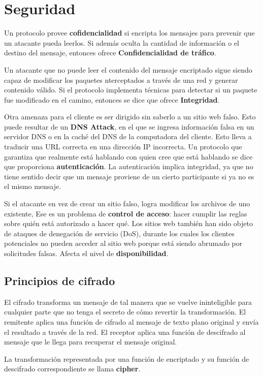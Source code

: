 \section{Seguridad}
Un protocolo provee \textbf{cofidencialidad} si encripta los mensajes para prevenir que un atacante pueda leerlos. Si además oculta la cantidad de información o el destino del mensaje, entonces ofrece \textbf{Confidencialidad de tráfico}.

Un atacante que no puede leer el contenido del mensaje encriptado sigue siendo capaz de modificar los paquetes nterceptados a través de una red y generar contenido válido. Si el protocolo implementa técnicas para detectar si un paquete fue modificado en el camino, entonces se dice que ofrece \textbf{Integridad}.

Otra amenaza para el cliente es ser dirigido sin saberlo a un sitio web falso. Esto puede resultar de un \textbf{DNS Attack}, en el que se ingresa información falsa en un servidor DNS o en la caché del DNS de la computadora del cliente. Esto lleva a traducir una URL correcta en una dirección IP incorrecta. Un protocolo que garantiza que realmente está hablando con quien cree que está hablando se dice que proporciona \textbf{autenticación}. La autenticación implica integridad, ya que no tiene sentido decir que un mensaje proviene de un cierto participante si ya no es el mismo mensaje.

Si el atacante en vez de crear un sitio falso, logra modificar los archivos de uno existente, Ese es un problema de \textbf{control de acceso}: hacer cumplir las reglas sobre quién está autorizado a hacer qué. Los sitios web también han sido objeto de ataques de denegación de servicio (DoS), durante los cuales los clientes potenciales no pueden acceder al sitio web porque está siendo abrumado por solicitudes falsas.  Afecta el nivel de \textbf{disponibilidad}.

\subsection{Principios de cifrado}
El cifrado transforma un mensaje de tal manera que se vuelve ininteligible para cualquier parte que no tenga el secreto de cómo revertir la transformación. El remitente aplica una función de cifrado al mensaje de texto plano original y envía el resultado a través de la red. El receptor aplica una función de descifrado al mensaje que le llega para recuperar el mensaje original.

La transformación representada por una función de encriptado y su función de descifrado correspondiente se llama \textbf{cipher}.

